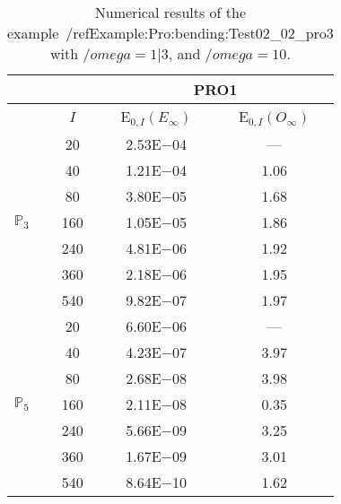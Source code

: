 \begin{table}[H]
\caption{Numerical results of the example~/ref{Example:Pro:bending:Test02_02_pro3} with $/omega=1|3$, and $/omega=10$.}
\setlength{\tabcolsep}{5pt}
\centering
\begin{tabular}{@{}l c c c@{}}
\toprule
 &  & \multicolumn{2}{c}{PRO1}\\
\midrule
 & $I$ & E$_{0,I}(E_{\infty})$ & E$_{0,I}(O_{\infty})$\\
\midrule
\multirow{7}{*}{$\mathbb{P}_{3}$}
 & 20 & 2.53E$-$04 & ---\\
 & 40 & 1.21E$-$04 & 1.06\\
 & 80 & 3.80E$-$05 & 1.68\\
 & 160 & 1.05E$-$05 & 1.86\\
 & 240 & 4.81E$-$06 & 1.92\\
 & 360 & 2.18E$-$06 & 1.95\\
 & 540 & 9.82E$-$07 & 1.97\\
\midrule
\multirow{7}{*}{$\mathbb{P}_{5}$}
 & 20 & 6.60E$-$06 & ---\\
 & 40 & 4.23E$-$07 & 3.97\\
 & 80 & 2.68E$-$08 & 3.98\\
 & 160 & 2.11E$-$08 & 0.35\\
 & 240 & 5.66E$-$09 & 3.25\\
 & 360 & 1.67E$-$09 & 3.01\\
 & 540 & 8.64E$-$10 & 1.62\\
\bottomrule
\end{tabular}
\label{Table:PRO:test_02_02_test8_pro3}
\end{table}
